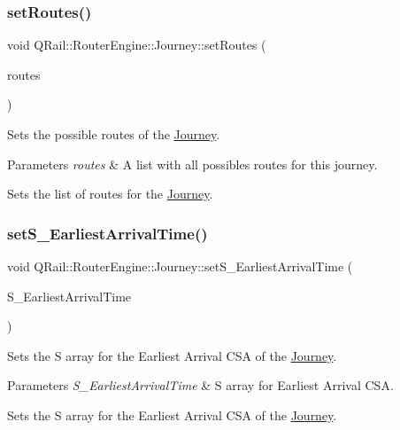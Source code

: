 \subsubsection{\texorpdfstring{setRoutes()}{setRoutes()}}
{\footnotesize\ttfamily void Q\+Rail\+::\+Router\+Engine\+::\+Journey\+::set\+Routes (\begin{DoxyParamCaption}\item[{const Q\+List$<$ \mbox{\hyperlink{classQRail_1_1RouterEngine_1_1Route}{Q\+Rail\+::\+Router\+Engine\+::\+Route}} $\ast$ $>$ \&}]{routes }\end{DoxyParamCaption})}



Sets the possible routes of the \mbox{\hyperlink{classQRail_1_1RouterEngine_1_1Journey}{Journey}}. 


\begin{DoxyParams}{Parameters}
{\em routes} & A list with all possibles routes for this journey.\\
\hline
\end{DoxyParams}
Sets the list of routes for the \mbox{\hyperlink{classQRail_1_1RouterEngine_1_1Journey}{Journey}}. \mbox{\label{classQRail_1_1RouterEngine_1_1Journey_acff9510bc00a4f052c28ee6151518d4d}} 
\subsubsection{\texorpdfstring{setS\_EarliestArrivalTime()}{setS\_EarliestArrivalTime()}}
{\footnotesize\ttfamily void Q\+Rail\+::\+Router\+Engine\+::\+Journey\+::set\+S\+\_\+\+Earliest\+Arrival\+Time (\begin{DoxyParamCaption}\item[{const Q\+Map$<$ Q\+Url, Q\+Date\+Time $>$ \&}]{S\+\_\+\+Earliest\+Arrival\+Time }\end{DoxyParamCaption})}



Sets the S array for the Earliest Arrival C\+SA of the \mbox{\hyperlink{classQRail_1_1RouterEngine_1_1Journey}{Journey}}. 


\begin{DoxyParams}{Parameters}
{\em S\+\_\+\+Earliest\+Arrival\+Time} & S array for Earliest Arrival C\+SA.\\
\hline
\end{DoxyParams}
Sets the S array for the Earliest Arrival C\+SA of the \mbox{\hyperlink{classQRail_1_1RouterEngine_1_1Journey}{Journey}}. \mbox{\label{classQRail_1_1RouterEngine_1_1Journey_a2f7b14171b6f2fbfcb3f5b5225e8f630}} 
